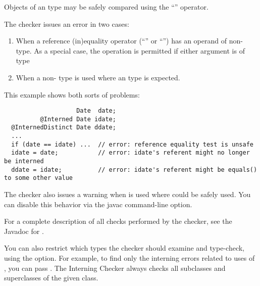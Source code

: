 
Objects of an  type may be safely compared using the ``\code{==}''
operator.

The checker issues an error in two cases:

\begin{enumerate}

\item
  When a reference (in)equality operator (``\code{==}'' or ``\code{!=}'')
  has an operand of non- type.
  As a special case, the operation is permitted if either argument is of
   type

\item
  When a non- type is used
  where an  type
  is expected.

\end{enumerate}

This example shows both sorts of problems:

\begin{Verbatim}
                    Date  date;
          @Interned Date idate;
  @InternedDistinct Date ddate;
  ...
  if (date == idate) ...  // error: reference equality test is unsafe
  idate = date;           // error: idate's referent might no longer be interned
  ddate = idate;          // error: idate's referent might be equals() to some other value
\end{Verbatim}

\label{lint-dotequals}

The checker also issues a warning when  is used where
\code{==} could be safely used.  You can disable this behavior via the
javac  command-line option.

For a complete description of all checks performed by
  the checker, see the Javadoc for
  .

\label{checking-class}
You can also restrict which types the checker should examine and type-check,
using the  option.  For example, to find only the
interning errors related to uses of , you can pass
.  The Interning Checker always checks all
subclasses and superclasses of the given class.


